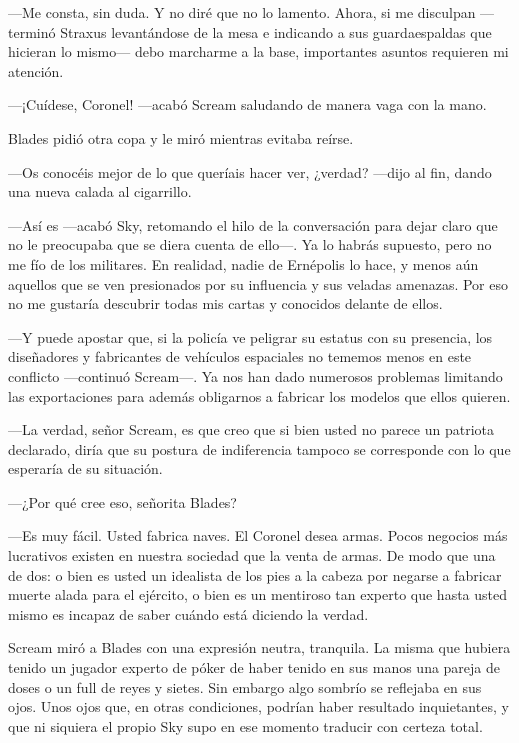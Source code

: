 ---Me consta, sin duda. Y no diré que no lo lamento. Ahora, si me disculpan ---terminó Straxus levantándose de la mesa e indicando a sus guardaespaldas que hicieran lo mismo--- debo marcharme a la base, importantes asuntos requieren mi atención.

---¡Cuídese, Coronel! ---acabó Scream saludando de manera vaga con la mano.

Blades pidió otra copa y le miró mientras evitaba reírse.

---Os conocéis mejor de lo que queríais hacer ver, ¿verdad? ---dijo al fin, dando una nueva calada al cigarrillo.

---Así es ---acabó Sky, retomando el hilo de la conversación para dejar claro que no le preocupaba que se diera cuenta de ello---. Ya lo habrás supuesto, pero no me fío de los militares. En realidad, nadie de Ernépolis lo hace, y menos aún aquellos que se ven presionados por su influencia y sus veladas amenazas. Por eso no me gustaría descubrir todas mis cartas y conocidos delante de ellos.

---Y puede apostar que, si la policía ve peligrar su estatus con su presencia, los diseñadores y fabricantes de vehículos espaciales no tememos menos en este conflicto ---continuó Scream---. Ya nos han dado numerosos problemas limitando las exportaciones para además obligarnos a fabricar los modelos que ellos quieren.

---La verdad, señor Scream, es que creo que si bien usted no parece un patriota declarado, diría que su postura de indiferencia tampoco se corresponde con lo que esperaría de su situación.

---¿Por qué cree eso, señorita Blades?

---Es muy fácil. Usted fabrica naves. El Coronel desea armas. Pocos negocios más lucrativos existen en nuestra sociedad que la venta de armas. De modo que una de dos: o bien es usted un idealista de los pies a la cabeza por negarse a fabricar muerte alada para el ejército, o bien es un mentiroso tan experto que hasta usted mismo es incapaz de saber cuándo está diciendo la verdad.

Scream miró a Blades con una expresión neutra, tranquila. La misma que hubiera tenido un jugador experto de póker de haber tenido en sus manos una pareja de doses o un full de reyes y sietes. Sin embargo algo sombrío se reflejaba en sus ojos. Unos ojos que, en otras condiciones, podrían haber resultado inquietantes, y que ni siquiera el propio Sky supo en ese momento traducir con certeza total.

